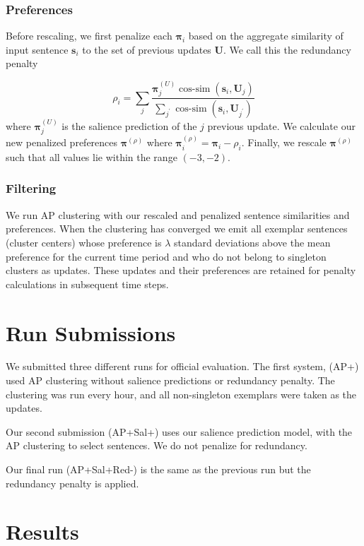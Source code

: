 \documentclass[10pt]{article} \usepackage{url} \usepackage{color}
\begin{document}
\subsubsection{Preferences}

Before rescaling, we first penalize each $\boldsymbol{\pi}_i$ based on
the aggregate similarity of input sentence $\mathbf{s}_i$ to the set of previous updates
$\mathbf{U}$. We call this the redundancy penalty 

$$\rho_i = \sum_j \frac{\boldsymbol{\pi}^{(U)}_{j}\operatorname{cos-sim}(\mathbf{s}_i, \mathbf{U}_j)}
{\sum_{j^\prime}\operatorname{cos-sim}(\mathbf{s}_i, \mathbf{U}_{j^\prime})} $$   
where $\boldsymbol{\pi}^{(U)}_{j}$ is the salience prediction of the $j$ 
previous update. We calculate our new penalized preferences 
$\boldsymbol{\pi}^{(\rho)}$ where $\boldsymbol{\pi}^{(\rho)}_i = \boldsymbol{\pi}_i - \rho_i$.
Finally, we rescale $\boldsymbol{\pi}^{(\rho)}$ such that all values lie 
within the range $(-3,-2)$.

\subsubsection{Filtering}

We run AP clustering with our rescaled and penalized sentence similarities
and preferences. When the clustering has converged we emit all exemplar
sentences (cluster centers) whose preference is $\lambda$ standard deviations
above the mean preference for the current time period and who do not belong
to singleton clusters as updates. These updates and their preferences are 
retained for penalty calculations in subsequent time steps.


\section{Run Submissions}

We submitted three different runs for official evaluation. The first system,
(AP+) used AP clustering without salience predictions or redundancy penalty.
The clustering was run every hour, and all non-singleton exemplars were 
taken as the updates.

Our second submission (AP+Sal+) uses our salience prediction model, with the
AP clustering to select sentences. We do not penalize for redundancy.

Our final run (AP+Sal+Red-) is the same as the previous run but the 
redundancy penalty is applied.

\section{Results}
\end{document}
